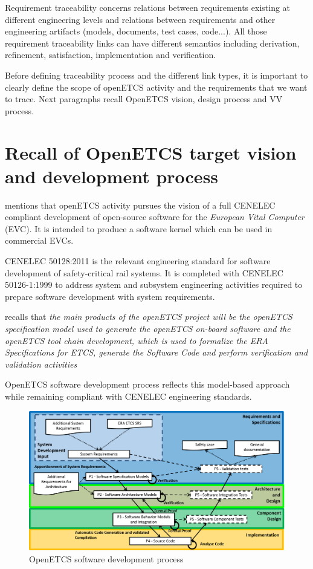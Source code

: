 \documentclass[11pt]{template/openetcs_report}
\begin{document}
Requirement traceability concerns relations between requirements existing at different engineering levels and relations between requirements and other engineering artifacts (models, documents, test cases, code...). All those requirement traceability links can have different semantics including derivation, refinement, satisfaction, implementation and verification. 

Before defining traceability process and the different link types, it is important to clearly define the scope of openETCS activity and the requirements that we want to trace. Next paragraphs recall OpenETCS vision, design process and VV process.

\section{Recall of OpenETCS target vision and development process}
\label{OpenETCS scope}
\cite{D2.3a} mentions that openETCS activity pursues the vision of a full CENELEC compliant development of open-source software for the \emph{European Vital   Computer} (EVC). It is intended to produce a software kernel which can be used in commercial EVCs.

CENELEC 50128:2011 is the relevant engineering standard for software development of safety-critical rail systems. It is completed with CENELEC 50126-1:1999 to address system and subsystem engineering activities required to prepare software development with system requirements. 


\cite{D4.2.3} recalls that \textit{the main products of the openETCS project will be the openETCS specification model used to generate the openETCS on-board software and the openETCS tool chain development, which is used to formalize the ERA Specifications for ETCS, generate the Software Code and perform verification and validation activities} 

OpenETCS software development process reflects this model-based approach while remaining compliant with CENELEC engineering standards. 

\begin{figure} [htbp]
\centering
\includegraphics[width=.9\linewidth]
{./images/OpenETCSDevelopmentProcess.png}
\caption{\label{fig:OpenETCSDevelopmentProcess}OpenETCS software development process}
\end{figure} 
\end{document}
